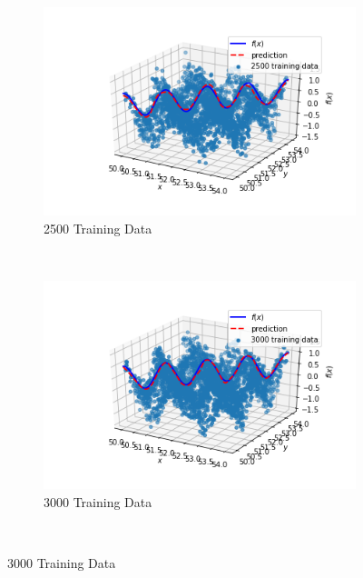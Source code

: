 \documentclass{article}
\begin{document}
     \addtocounter{figure}{-1}  
\begin{figure}[htbp]
\center

    \begin{subfigure}{0.45\textwidth}
        \includegraphics[width=\textwidth]{figures/2500TrainingData}
           \addtocounter{subfigure}{4}  
        \caption{2500 Training Data}
    \end{subfigure}
        ~ %
    \begin{subfigure}{0.45\textwidth}
        \includegraphics[width=\textwidth]{figures/3000TrainingData}
        \caption{3000 Training Data}
    \end{subfigure}
~ %

\end{figure}
\end{document}
